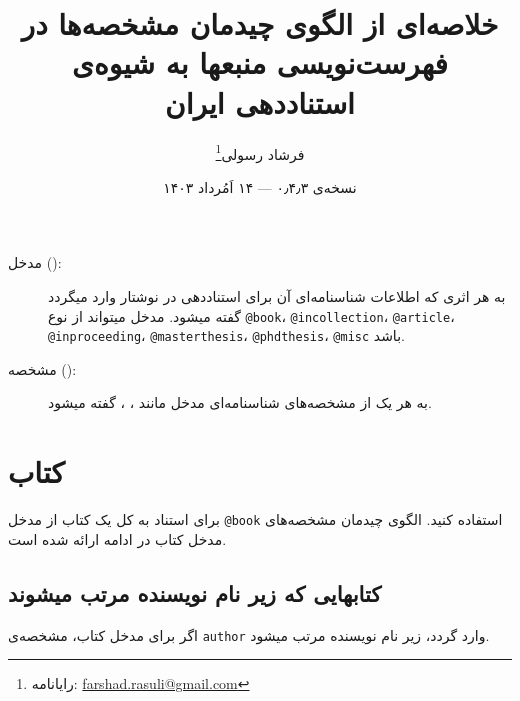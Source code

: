 \documentclass[a4paper,11pt]{article}
\begin{document}
\title{خلاصه‌ای از الگوی چیدمان مشخصه‌ها در فهرست‌نویسی منبعها به شیوه‌ی استناددهی ایران}
\author{فرشاد رسولی\thanks{رایانامه: \url{farshad.rasuli@gmail.com}}}
\date{نسخه‌ی ۰٫۴٫۳ --- ۱۴ اَمُرداد ۱۴۰۳}
\maketitle


\begin{description}
\item[مدخل ():]
به هر اثری که اطلاعات شناسنامه‌ای آن برای استناددهی  در نوشتار وارد میگردد گفته میشود. مدخل میتواند از نوع \verb|@book|، \verb|@incollection|، \verb|@article|، \verb|@inproceeding|، \verb|@masterthesis|، \verb|@phdthesis|، \verb|@misc| باشد.
\item[مشخصه ():]
به هر یک از مشخصه‌های شناسنامه‌ای مدخل مانند ، ،  گفته میشود.
\end{description}



\renewcommand{\contentsname}{فهرست}
\tableofcontents










\section{کتاب}
برای استناد به کل یک کتاب از مدخل \verb|@book| استفاده کنید. الگوی چیدمان مشخصه‌های مدخل کتاب در ادامه ارائه شده است.





\subsection{کتابهایی که زیر نام نویسنده مرتب میشوند}
اگر برای مدخل کتاب، مشخصه‌ی \verb|author| وارد گردد، زیر نام نویسنده مرتب میشود.
\end{document}
